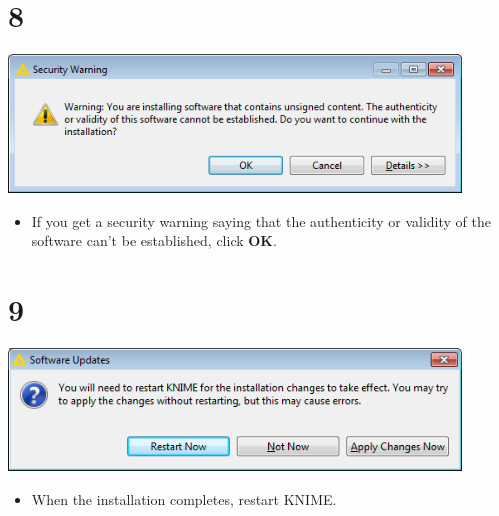 \documentclass{beamer}
\begin{document}
\section{8}
\begin{frame}
	\begin{center}
  		\includegraphics[width=0.9\textwidth]{8.png}
	\end{center}
	\begin{itemize}
		\item If you get a security warning saying that the authenticity or validity of the software can't be established, click \textbf{OK}.
	\end{itemize}
\end{frame}

\section{9}
\begin{frame}
	\begin{center}
  		\includegraphics[width=0.9\textwidth]{9.png}
	\end{center}
	\begin{itemize}
		\item When the installation completes, restart KNIME.
	\end{itemize}
\end{frame}
\end{document}
